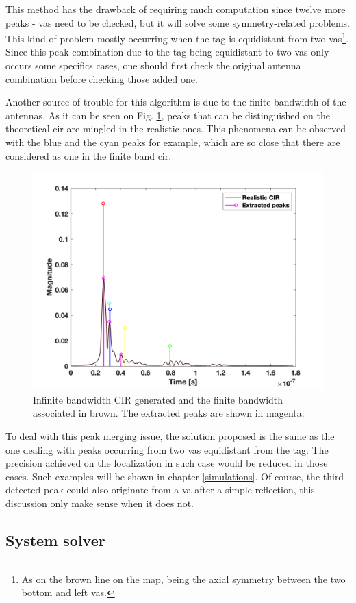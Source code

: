This method has the drawback of requiring much computation since twelve more peaks - \glspl{va} need to be checked, but it will solve some symmetry-related problems. This kind of problem mostly occurring when the tag is equidistant from two \glspl{va}\footnote{As on the brown line on the map, being the axial symmetry between the two bottom and left \glspl{va}.}. Since this peak combination due to the tag being equidistant to two \glspl{va} only occurs some specifics cases, one should first check the original antenna combination before checking those added one.
\vspace{2mm}

Another source of trouble for this algorithm is due to the finite bandwidth of the antennas. As it can be seen on Fig. \ref{fig:inftofin}, peaks that can be distinguished on the theoretical \gls{cir} are mingled in the realistic ones. This phenomena can be observed with the blue and the cyan peaks for example, which are so close that there are considered as one in the finite band \gls{cir}.

\begin{figure}[H]
\centering
\includegraphics[width=.55\linewidth]{Images/Fig_inf_to_fin.png}
\caption{Infinite bandwidth CIR generated and the finite bandwidth associated in brown. The extracted peaks are shown in magenta. \label{fig:inftofin}}
\end{figure}

To deal with this peak merging issue, the solution proposed is the same as the one dealing with peaks occurring from two \glspl{va} equidistant from the tag. The precision achieved on the localization in such case would be reduced  in those cases. Such examples will be shown in chapter \ref{simulations}. Of course, the third detected peak could also originate from a \gls{va} after a simple reflection, this discussion only make sense when it does not.
\vspace{2mm}

\subsection{System solver}


